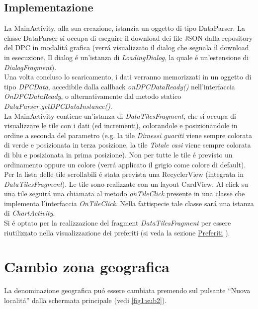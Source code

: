 \documentclass{article}
\newcommand{\quotes}[1]{``#1''}
\begin{document}
    \subsection{Implementazione}

    La MainActivity, alla sua creazione, istanzia un oggetto di tipo DataParser.
    La classe DataParser si occupa di eseguire il download dei file JSON dalla repository del DPC in modalitá grafica (verrá visualizzato il dialog che segnala il download in esecuzione. Il dialog é un'istanza di \emph{LoadingDialog}, la quale é un'estensione di \emph{DialogFragment}).
    \\
    Una volta concluso lo scaricamento, i dati verranno memorizzati in un oggetto di tipo \emph{DPCData}, accedibile dalla callback \emph{onDPCDataReady()} nell'interfaccia \emph{OnDPCDataReady}, o alternativamente dal metodo statico \emph{DataParser.getDPCDataInstance()}.
    \\
    La MainActivity contiene un'istanza di \emph{DataTilesFragment}, che si occupa di visualizzare le tile con i dati (ed incrementi), colorandole e posizionandole in ordine a seconda del parametro 
    (e.g. la tile \emph{Dimessi guariti} viene sempre colorata di verde e posizionata in terza posizione, la tile \emph{Totale casi} viene sempre colorata di blu e posizionata in prima posizione). 
    Non per tutte le tile é previsto un ordinamento oppure un colore (verrá applicato il grigio come colore di default).
    \\
    Per la lista delle tile scrollabili é stata prevista una RecyclerView (integrata in \emph{DataTilesFragment}). Le tile sono realizzate con un layout CardView.
    Al click su una tile seguirá una chiamata al metodo \emph{onTileClick} presente in una classe che implementa l'interfaccia \emph{OnTileClick}. Nella fattispecie tale classe sará una istanza di \emph{ChartActivity}.
    \\
    Si é optato per la realizzazione del fragment \emph{DataTilesFragment} per essere riutilizzato nella visualizzazione dei preferiti (si veda la sezione \hyperref[sec:preferiti]{Preferiti} ).

    \section{Cambio zona geografica}
    La denominazione geografica puó essere cambiata premendo sul pulsante \quotes{Nuova localitá} dalla schermata principale (vedi \ref{fig1:sub2}).
    \\
\end{document}
